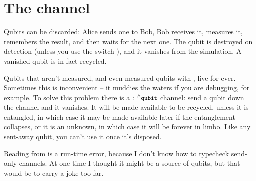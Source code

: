 \section{The  channel}

Qubits can be discarded: Alice sends one to Bob, Bob receives it, measures it, remembers the result, and then waits for the next one. The qubit is destroyed on detection (unless you use the switch ), and it vanishes from the simulation. A vanished qubit is in fact recycled.

Qubits that aren't measured, and even measured qubits with , live for ever. Sometimes this is inconvenient -- it muddies the waters if you are debugging, for example. To solve this problem there is a : ${}^{\wedge}{}\texttt{\small{}qubit}$ channel: send a qubit down the  channel and it vanishes. It will be made available to be recycled, unless it is entangled, in which case it may be made available later if the entanglement collapses, or it is an unknown, in which case it will be forever in limbo. Like any sent-away qubit, you can't use it once it's disposed.

Reading from  is a run-time error, because I don't know how to typecheck send-only channels. At one time I thought it might be a source of qubits, but that would be to carry a joke too far.
